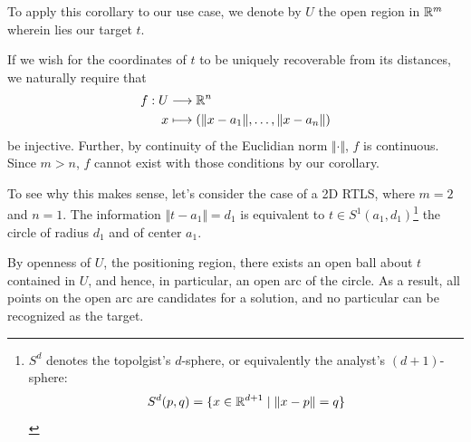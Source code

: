 To apply this corollary to our use case, we denote by $U$ the open region in $\mathbb R^m$ wherein lies our target $t$.

If we wish for the coordinates of $t$ to be uniquely recoverable from its distances, we naturally require that
\begin{align*}
    f: U &\longrightarrow\mathbb R^n \\
    x &\longmapsto (\Vert x-a_1\Vert,\dots,\Vert x-a_n\Vert)
\end{align*}
be injective. Further, by continuity of the Euclidian norm $\Vert \cdot\Vert$, $f$ is continuous. Since $m>n$, $f$ cannot exist with those conditions by our corollary.

To see why this makes sense, let's consider the case of a 2D RTLS, where $m=2$ and $n=1$. The information $\Vert t-a_1\Vert=d_1$ is equivalent to $t\in S^1(a_1, d_1)$\footnote{$S^d$ denotes the topolgist's $d$-sphere, or equivalently the analyst's $(d+1)$-sphere: $$S^d(p,q) = \{ x\in\mathbb R^{d+1}\mid \Vert x-p\Vert=q \}$$}
the circle of radius $d_1$ and of center $a_1$.

By openness of $U$, the positioning region, there exists an open ball about $t$ contained in $U$, and hence, in particular, an open arc of the circle. As a result, all points on the open arc are candidates for a solution, and no particular can be recognized as the target.

